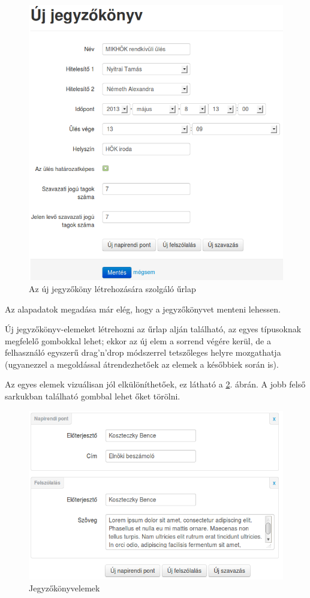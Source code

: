 \documentclass[a4paper,12pt,oneside]{report}
\begin{document}
\begin{figure}[h]
    \centering
    \includegraphics[width=.9\textwidth]{jegyzokonyv_uj.png}
    \caption{Az új jegyzőköny létrehozására szolgáló űrlap}
    \label{fig:jegyzokonyv_uj}
\end{figure}

Az alapadatok megadása már elég, hogy a jegyzőkönyvet menteni lehessen.

Új jegyzőkönyv-elemeket létrehozni az űrlap alján található, az egyes típusoknak megfelelő gombokkal lehet; ekkor az új elem a sorrend végére kerül, de a felhasználó egyszerű drag'n'drop módszerrel tetszőleges helyre mozgathatja (ugyanezzel a megoldással átrendezhetőek az elemek a későbbiek során is).

Az egyes elemek vizuálisan jól elkülöníthetőek, ez látható a \ref{fig:jegyzokonyv_szerkesztes}. ábrán. A jobb felső sarkukban található gombbal lehet őket törölni.

\begin{figure}[h]
    \centering
    \includegraphics[width=\textwidth]{jegyzokonyv_szerkesztes.png}
    \caption{Jegyzőkönyvelemek}
    \label{fig:jegyzokonyv_szerkesztes}
\end{figure}
\end{document}

